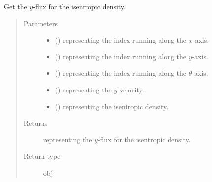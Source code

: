 \documentclass[letterpaper,10pt,english]{sphinxmanual}
\begin{document}
\begin{fulllineitems}
\begin{fulllineitems}
\end{fulllineitems}


\begin{fulllineitems}
\label{\detokenize{api:dycore.flux_isentropic_nonconservative_centered.FluxIsentropicNonconservativeCentered._get_centered_flux_y_s}}
Get the \(y\)-flux for the isentropic density.
\begin{quote}\begin{description}
\item[{Parameters}] \leavevmode\begin{itemize}
\item {} 
 () \textendash{}  representing the index running along the \(x\)-axis.

\item {} 
 () \textendash{}  representing the index running along the \(y\)-axis.

\item {} 
 () \textendash{}  representing the index running along the \(\theta\)-axis.

\item {} 
 () \textendash{}  representing the \(y\)-velocity.

\item {} 
 () \textendash{}  representing the isentropic density.

\end{itemize}

\item[{Returns}] \leavevmode
{} representing the \(y\)-flux for the isentropic density.

\item[{Return type}] \leavevmode
obj

\end{description}\end{quote}


\end{fulllineitems}
\end{fulllineitems}
\end{document}

